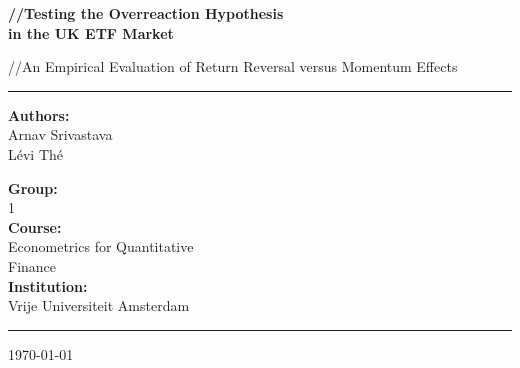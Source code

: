 \documentclass[11pt,a4paper]{article}
\begin{document}
\hypersetup{pageanchor=false}
\begin{titlepage}
\centering
\vspace*{3cm}
{\LARGE\bfseries //Testing the Overreaction Hypothesis\\[0.2cm] in the UK ETF Market\par}
\vspace{0.8cm}
{\large //An Empirical Evaluation of Return Reversal versus Momentum Effects\par}
\vspace{2.5cm}
\rule{\textwidth}{0.8pt}\par
\vspace{0.4cm}
\begin{minipage}[t]{0.48\textwidth}
\raggedright
\vspace*{1.4cm}
\textbf{Authors:}\\
Arnav Srivastava\\
L\'evi Th\'e
\end{minipage}\hfill
\begin{minipage}[t]{0.48\textwidth}
\raggedleft
\textbf{Group:}\\
1\\[0.3cm]
\textbf{Course:}\\
Econometrics for Quantitative\\
Finance\\[0.3cm]
\textbf{Institution:}\\
Vrije Universiteit Amsterdam
\end{minipage}\par
\vspace{0.4cm}
\rule{\textwidth}{0.8pt}\par
\vfill
{\large \today\par}
\end{titlepage}
\hypersetup{pageanchor=true}
\end{document}
